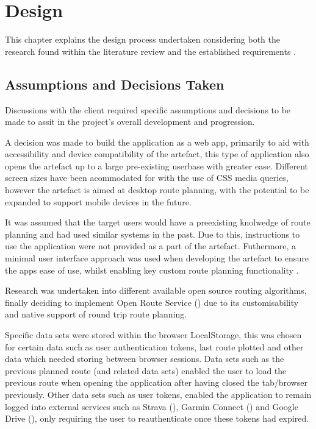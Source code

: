 \chapter{Design}
\label{chap:design}

This chapter explains the design process undertaken considering both the research found within the literature review  and the established requirements .
\section{Assumptions and Decisions Taken}
\label{design:assumptions/decisions}

Discussions with the client required specific assumptions and decisions to be made to assit in the project's overall development and progression.

A decision was made to build the application as a web app, primarily to aid with accessibility and device compatibility of the artefact, this type of application also opens the artefact up to a large pre-existing userbase with greater ease. Different screen sizes have been acommodated for with the use of CSS media queries, however the artefact is aimed at desktop route planning, with the potential to be expanded to support mobile devices in the future. 

It was assumed that the target users would have a preexisting knolwedge of route planning and had used similar systems in the past. Due to this, instructions to use the application were not provided as a part of the artefact. Futhermore, a minimal user interface approach was used when developing the artefact to ensure the apps ease of use, whilst enabling key custom route planning functionality .

Research was undertaken into different available open source routing algorithms, finally deciding to implement Open Route Service (\cite{noauthor_openrouteservice_nodate}) due to its customisability and native support of round trip route planning.

Specific data sets were stored within the browser LocalStorage, this was chosen for certain data such as user authentication tokens, last route plotted and other data which needed storing between browser sessions. Data sets such as the previous planned route (and related data sets) enabled the user to load the previous route when opening the application after having closed the tab/browser previously. Other data sets such as user tokens, enabled the application to remain logged into external services such as Strava (\cite{noauthor_strava_nodate}), Garmin Connect (\cite{international_garmin_nodate}) and Google Drive (\cite{noauthor_home_nodate}), only requiring the user to reauthenticate once these tokens had expired.

